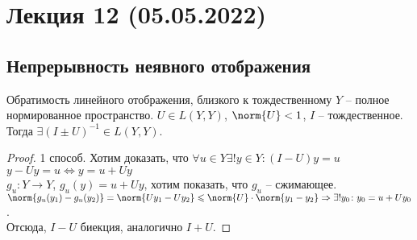 \section*{Лекция 12 (05.05.2022)}

\subsection{Непрерывность неявного отображения}

\begin{namedlemma}{Обратимость линейного отображения, близкого к тождественному}
    $Y$ -- полное нормированное пространство. $U \in L(Y, Y)$, $\norm{U} < 1$, $I$ -- тождественное. Тогда $\exists (I \pm U)^{-1} \in L(Y, Y)$.
\end{namedlemma}
\begin{proof}
    \item[1 способ.] Хотим доказать, что $\forall u \in Y \exists! y \in Y \colon (I - U)y = u$ \\
    $y - Uy = u \Leftrightarrow y = u + Uy$\\
    $g_u \colon Y \to Y$, $g_u(y) = u + Uy$, хотим показать, что $g_u$ -- сжимающее.\\
    $\norm{g_u(y_1) - g_u(y_2)} = \norm{Uy_1 - Uy_2} \leqslant \norm{U} \cdot \norm{y_1 - y_2} \Rightarrow \exists! y_0 \colon y_0 = u + Uy_0$. \\
    Отсюда, $I - U$ биекция, аналогично $I + U$.


\end{proof}
